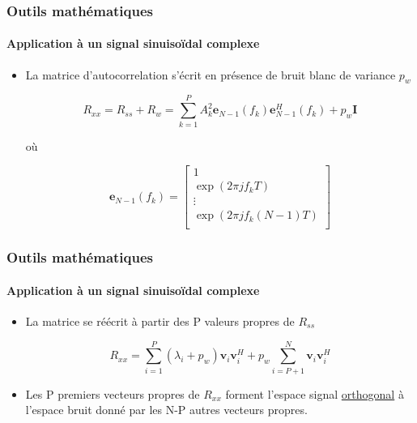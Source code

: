 \documentclass[10pt]{beamer}
\begin{document}
        \begin{frame}
    
        \frametitle{Outils mathématiques}
        \framesubtitle{Application à un signal sinuisoïdal complexe}
        
        \begin{itemize}
        
        \item La matrice d'autocorrelation s'écrit en présence de bruit blanc de variance \(p_w\) 

        \begin{equation}
            \label{eq:Ryy}
            R_{xx}= R_{ss} + R_w =\sum_{k=1}^{P}A_k^2 \boldsymbol{e}_{N-1}(f_k) \boldsymbol{e}_{N-1}^H(f_k) + p_w\boldsymbol{I}
        \end{equation}
        
        où 

        \begin{equation}
            \label{eq:em}
            \boldsymbol{e}_{N-1}(f_k)=\begin{bmatrix}
                1 \\
                \exp (2 \pi j f_k T) \\
                \vdots \\
                \exp (2 \pi j f_k (N-1)T) \\
            \end{bmatrix}
        \end{equation}
        
                
        \end{itemize}
    \end{frame}
        
    
        \begin{frame}
    
        \frametitle{Outils mathématiques}
        \framesubtitle{Application à un signal sinuisoïdal complexe}
        
        \begin{itemize}        
        \item La matrice se réécrit à partir des P valeurs propres de \(R_{ss}\)
        
        \begin{equation}
%
        \label{eq:RyyEigen}
        R_{xx} = \sum_{i=1}^{P}(\lambda _i + p_w) \boldsymbol{v}_{i} \boldsymbol{v}_{i}^H + p_w\sum_{i=P+1}^{N} \boldsymbol{v}_{i} \boldsymbol{v}_{i}^H
%
        \end{equation} 
        
        \item Les P premiers vecteurs propres de \(R_{xx}\) forment l'espace signal \underline {orthogonal} à l'espace bruit donné par les N-P autres vecteurs propres. 
        
        \end{itemize}
    \end{frame}
    
\end{document}
